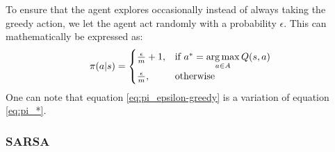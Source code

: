 To ensure that the agent explores occasionally instead of always taking the greedy action, we let the agent act randomly with a probability $\epsilon$. This can mathematically be expressed as:
\begin{align}
	\pi(a|s)=\begin{cases}
		\frac{\epsilon}{m}+1, & \text{if $a^* = \operatorname*{arg\,max}\limits_{a \in A}Q (s,a)$}\\
		\frac{\epsilon}{m}, & \text{otherwise}
	\end{cases}
	\label{eq:pi_epsilon-greedy}
\end{align}
One can note that equation \ref{eq:pi_epsilon-greedy} is a variation of equation \ref{eq:pi_*}.

\subsubsection{SARSA}

